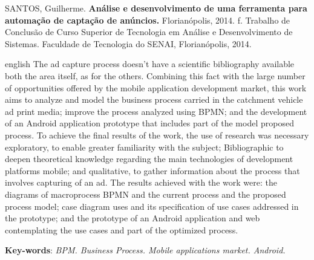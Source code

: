 \noindent
SANTOS, Guilherme. \textbf{Análise e desenvolvimento de uma ferramenta para automação de captação de anúncios.}
Florianópolis, 2014. \pageref{nropaginas}f. Trabalho de Conclusão de Curso Superior de Tecnologia em
Análise e Desenvolvimento de Sistemas. Faculdade de Tecnologia do SENAI, Florianópolis, 2014.

\vspace{1cm}
\begin{resumo}
 \begin{otherlanguage*}{english}
   The ad capture process doesn’t have a scientific bibliography available both the area itself, as for the others. Combining this fact with the large number of opportunities offered by the mobile application development market, this work aims to analyze and model the business process carried in the catchment vehicle ad print media; improve the process analyzed using BPMN; and the development of an Android application prototype that includes part of the model proposed process. To achieve the final results of the work, the use of research was necessary exploratory, to enable greater familiarity with the subject; Bibliographic to deepen theoretical knowledge regarding the main technologies of development platforms mobile; and qualitative, to gather information about the process that involves capturing of an ad. The results achieved with the work were: the diagrams of macroprocess BPMN and the current process and the proposed process model; case diagram uses and its specification of use cases addressed in the prototype; and the prototype of an Android application and web contemplating the use cases and part of the optimized process.

   \vspace{\onelineskip}
 
   \noindent 
   \textbf{Key-words}: \textit{BPM. Business Process. Mobile applications market. Android.}
 \end{otherlanguage*}
\end{resumo}

